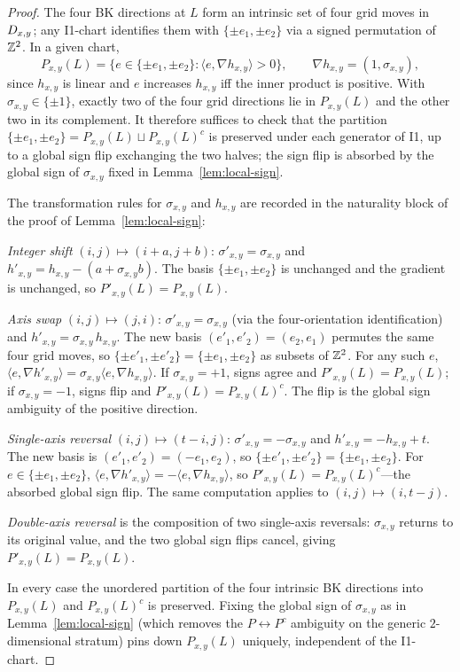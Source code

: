 \begin{proof}
The four BK directions at $L$ form an intrinsic set of four grid moves in
$D_{x,y}$; any \textsc{I1}-chart identifies them with $\{\pm e_1,\pm e_2\}$ via
a signed permutation of $\mathbb{Z}^2$. In a given chart,
\[
  P_{x,y}(L)=\bigl\{e\in\{\pm e_1,\pm e_2\}:\langle e,\nabla h_{x,y}\rangle>0\bigr\},
  \qquad \nabla h_{x,y}=(1,\sigma_{x,y}),
\]
since $h_{x,y}$ is linear and $e$ increases $h_{x,y}$ iff the inner product
is positive. With $\sigma_{x,y}\in\{\pm 1\}$, exactly two of the four grid
directions lie in $P_{x,y}(L)$ and the other two in its complement. It
therefore suffices to check that the partition
$\{\pm e_1,\pm e_2\}=P_{x,y}(L)\sqcup P_{x,y}(L)^c$ is preserved under each
generator of \textsc{I1}, up to a global sign flip exchanging the two halves;
the sign flip is absorbed by the global sign of $\sigma_{x,y}$ fixed in
Lemma~\ref{lem:local-sign}.

The transformation rules for $\sigma_{x,y}$ and $h_{x,y}$ are recorded in the
naturality block of the proof of Lemma~\ref{lem:local-sign}:

\emph{Integer shift} $(i,j)\mapsto(i+a,j+b)$: $\sigma'_{x,y}=\sigma_{x,y}$
and $h'_{x,y}=h_{x,y}-(a+\sigma_{x,y}b)$. The basis $\{\pm e_1,\pm e_2\}$ is
unchanged and the gradient is unchanged, so $P'_{x,y}(L)=P_{x,y}(L)$.

\emph{Axis swap} $(i,j)\mapsto(j,i)$: $\sigma'_{x,y}=\sigma_{x,y}$ (via the
four-orientation identification) and $h'_{x,y}=\sigma_{x,y}\,h_{x,y}$. The
new basis $(e'_1,e'_2)=(e_2,e_1)$ permutes the same four grid moves, so
$\{\pm e'_1,\pm e'_2\}=\{\pm e_1,\pm e_2\}$ as subsets of $\mathbb{Z}^2$. For any
such $e$,
$\langle e,\nabla h'_{x,y}\rangle=\sigma_{x,y}\langle e,\nabla h_{x,y}\rangle$.
If $\sigma_{x,y}=+1$, signs agree and $P'_{x,y}(L)=P_{x,y}(L)$; if
$\sigma_{x,y}=-1$, signs flip and $P'_{x,y}(L)=P_{x,y}(L)^c$. The flip is
the global sign ambiguity of the positive direction.

\emph{Single-axis reversal} $(i,j)\mapsto(t-i,j)$:
$\sigma'_{x,y}=-\sigma_{x,y}$ and $h'_{x,y}=-h_{x,y}+t$. The new basis is
$(e'_1,e'_2)=(-e_1,e_2)$, so $\{\pm e'_1,\pm e'_2\}=\{\pm e_1,\pm e_2\}$.
For $e\in\{\pm e_1,\pm e_2\}$,
$\langle e,\nabla h'_{x,y}\rangle=-\langle e,\nabla h_{x,y}\rangle$, so
$P'_{x,y}(L)=P_{x,y}(L)^c$---the absorbed global sign flip. The same
computation applies to $(i,j)\mapsto(i,t-j)$.

\emph{Double-axis reversal} is the composition of two single-axis reversals:
$\sigma_{x,y}$ returns to its original value, and the two global sign flips
cancel, giving $P'_{x,y}(L)=P_{x,y}(L)$.

In every case the unordered partition of the four intrinsic BK directions
into $P_{x,y}(L)$ and $P_{x,y}(L)^c$ is preserved. Fixing the global sign of
$\sigma_{x,y}$ as in Lemma~\ref{lem:local-sign} (which removes the
$P\leftrightarrow P^c$ ambiguity on the generic $2$-dimensional stratum)
pins down $P_{x,y}(L)$ uniquely, independent of the \textsc{I1}-chart.
\end{proof}

